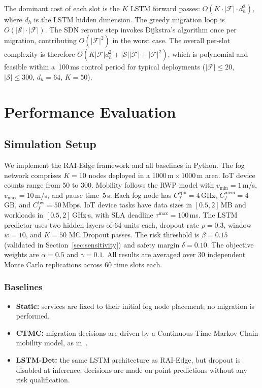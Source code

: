 \documentclass[conference]{IEEEtran}
\newcommand{\F}{\mathcal{F}}
\newcommand{\Set}[1]{\mathcal{#1}}
\begin{document}
The dominant cost of each slot is the $K$ LSTM forward passes:
$O(K \cdot |\F| \cdot d_h^2)$, where $d_h$ is the LSTM hidden dimension.
The greedy migration loop is $O(|\Set{S}| \cdot |\F|)$.
The SDN reroute step invokes Dijkstra's algorithm once per migration,
contributing $O(|\F|^2)$ in the worst case.
The overall per-slot complexity is therefore
$O(K|\F|d_h^2 + |\Set{S}||\F| + |\F|^2)$, which is polynomial and
feasible within a~100\,ms control period for typical deployments
($|\F| \leq 20$, $|\Set{S}| \leq 300$, $d_h = 64$, $K = 50$).

\section{Performance Evaluation}
\label{sec:eval}

\subsection{Simulation Setup}

We implement the RAI-Edge framework and all baselines in Python. The
fog network comprises $K=10$ nodes deployed in a
$1000\,\mathrm{m} \times 1000\,\mathrm{m}$ area. IoT device counts
range from 50 to 300. Mobility follows the RWP model with
$v_{\min}=1$\,m/s, $v_{\max}=10$\,m/s, and pause time~$5$\,s.
Each fog node has $C_f^{\mathrm{cpu}} = 4$\,GHz, $C_f^{\mathrm{mem}}
= 4$\,GB, and $C_f^{\mathrm{bw}} = 50$\,Mbps. IoT device tasks have
data sizes in $[0.5,2]$\,MB and workloads in $[0.5,2]$\,GHz$\cdot$s,
with SLA deadline $\tau^{\max} = 100$\,ms. The LSTM predictor uses two
hidden layers of 64 units each, dropout rate $\rho=0.3$, window $w=10$,
and $K=50$ MC Dropout passes. The risk threshold is $\beta=0.15$
(validated in Section~\ref{sec:sensitivity}) and safety margin $\delta=0.10$.
The objective weights are $\alpha = 0.5$ and $\gamma = 0.1$.
All results are averaged over 30 independent Monte Carlo replications
across 60 time slots each.

\subsubsection*{Baselines}
\begin{itemize}
  \item \textbf{Static:} services are fixed to their initial fog node
        placement; no migration is performed.
  \item \textbf{CTMC:} migration decisions are driven by a
        Continuous-Time Markov Chain mobility model, as in~\cite{wang2019mobility}.
  \item \textbf{LSTM-Det:} the same LSTM architecture as RAI-Edge, but
        dropout is disabled at inference; decisions are made on point
        predictions without any risk qualification.
\end{itemize}
\end{document}

